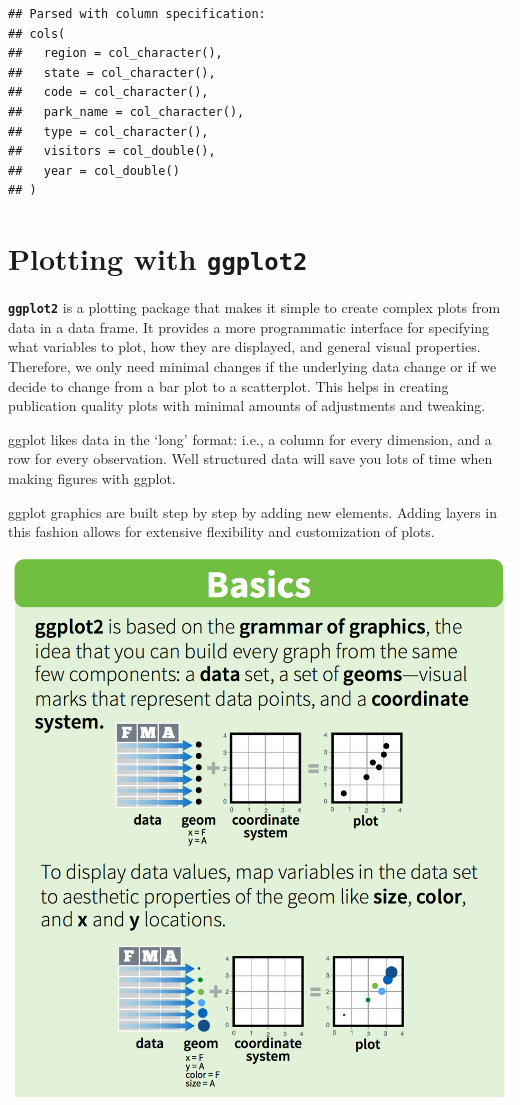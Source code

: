 \documentclass[]{book}
\begin{document}
\begin{verbatim}
## Parsed with column specification:
## cols(
##   region = col_character(),
##   state = col_character(),
##   code = col_character(),
##   park_name = col_character(),
##   type = col_character(),
##   visitors = col_double(),
##   year = col_double()
## )
\end{verbatim}

\hypertarget{plotting-with-ggplot2}{%
\section{\texorpdfstring{Plotting with \textbf{\texttt{ggplot2}}}{Plotting with ggplot2}}\label{plotting-with-ggplot2}}

\textbf{\texttt{ggplot2}} is a plotting package that makes it simple to create complex plots from data in a data frame. It provides a more programmatic interface for specifying what variables to plot, how they are displayed, and general visual properties. Therefore, we only need minimal changes if the underlying data change or if we decide to change from a bar plot to a scatterplot. This helps in creating publication quality plots with minimal amounts of adjustments and tweaking.

ggplot likes data in the `long' format: i.e., a column for every dimension, and a row for every observation. Well structured data will save you lots of time when making figures with ggplot.

ggplot graphics are built step by step by adding new elements. Adding layers in this fashion allows for extensive flexibility and customization of plots.

\includegraphics{img/rstudio-cheatsheet-ggplot.png}
\end{document}
